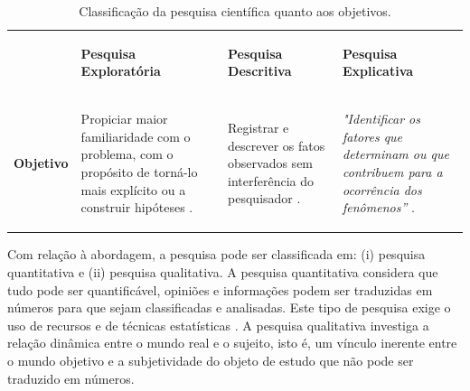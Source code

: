 \begin{table}[h]
 \centering
 \caption{Classificação da pesquisa científica quanto aos objetivos.}
 \label{tab:classificacao_pesquisa}
 {\renewcommand\arraystretch{0.25}
 \begin{tabular}{ l l l l }
  \hline
    \multicolumn{1}{p{1.883cm}}{\begin{center} 
\end{center}} &
    \multicolumn{1}{p{3.517cm}}{\begin{center}\textbf{Pesquisa Exploratória}
\end{center}} &
    \multicolumn{1}{p{3.600cm}}{\begin{center}\textbf{Pesquisa Descritiva}
\end{center}} &
    \multicolumn{1}{p{3.583cm}}{\begin{center}\textbf{Pesquisa Explicativa}
\end{center}}
  \\  
  \cline{1-1}\cline{2-2}\cline{3-3}\cline{4-4}  
    \multicolumn{1}{p{1.883cm}}{\begin{center}\textbf{Objetivo}
\end{center}} &
    \multicolumn{1}{p{3.517cm}}{\begin{center}Propiciar maior familiaridade com o problema, com o propósito de torná-lo mais explícito ou a construir hipóteses \cite[pág. 41]{gil2002}.
\end{center}} &
    \multicolumn{1}{p{3.600cm}}{\begin{center}Registrar e descrever os fatos observados sem interferência do pesquisador \cite[pág. 52]{prodanov2013}.
\end{center}} &
    \multicolumn{1}{p{3.583cm}}{\begin{center}\textit{"Identificar os fatores que determinam ou que contribuem para a ocorrência dos fenômenos”} \cite[pág. 42]{gil2002}.
\end{center}}
  \\  
  \hline

 \end{tabular} }
\end{table}

Com relação à abordagem, a pesquisa pode ser classificada em: (i) pesquisa quantitativa e (ii) pesquisa qualitativa. A pesquisa quantitativa considera que tudo pode ser quantificável, opiniões e informações podem ser traduzidas em números para que sejam classificadas e analisadas. Este tipo de pesquisa exige o uso de recursos e de técnicas estatísticas \cite{prodanov2013}. A pesquisa qualitativa investiga a relação dinâmica entre o mundo real e o sujeito, isto é, um vínculo inerente entre o mundo objetivo e a subjetividade do objeto de estudo que não pode ser traduzido em números. 

